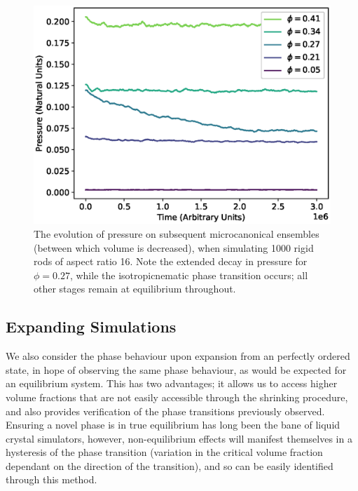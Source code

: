 \documentclass[11pt, a4paper]{article} %
\begin{document}
\begin{figure} [h!]
	\centering
	\includegraphics[width=0.7\linewidth]{Figures/rigidrod_pressureevo}
	\caption{The evolution of pressure on subsequent microcanonical ensembles (between which volume is decreased), when simulating 1000 rigid rods of aspect ratio 16. Note the extended decay in pressure for $\phi  = 0.27$, while the isotropic\textendash nematic phase transition occurs; all other stages remain at equilibrium throughout.}
	\label{fig:rr_pressureevo}
\end{figure} %



\subsection{Expanding Simulations}

We also consider the phase behaviour upon expansion from an perfectly ordered state, in hope of observing the same phase behaviour, as would be expected for an equilibrium system. This has two advantages; it allows us to access higher volume fractions that are not easily accessible through the shrinking procedure, and also provides verification of the phase transitions previously observed. Ensuring a novel phase is in true equilibrium has long been the bane of liquid crystal simulators, however, non-equilibrium effects will manifest themselves in a hysteresis of the phase transition (variation in the critical volume fraction dependant on the direction of the transition), and so can be easily identified through this method.
\end{document}
